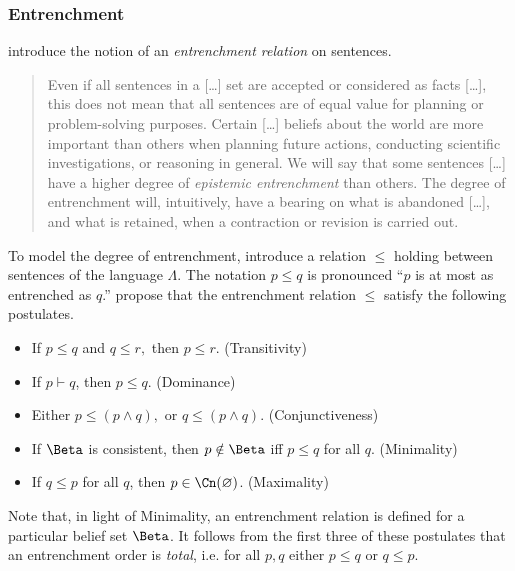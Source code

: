 \subsubsection{Entrenchment}
\label{entrenchment}
\citet{gardenfors1988revisions} introduce the notion of an {\em entrenchment
relation} on sentences.
\begin{quote}
  Even if all sentences in a [\ldots] set are accepted or considered as facts
  [\ldots], this does not mean that all sentences are of equal value for planning
  or problem-solving purposes. Certain [\ldots] beliefs about the world are more
  important than others when planning future actions, conducting scientific
  investigations, or reasoning in general. We will say that some sentences
  [\ldots] have a higher degree of {\em epistemic entrenchment} than others. The
  degree of entrenchment will, intuitively, have a bearing on what is abandoned
  [\ldots], and what is retained, when a contraction or revision is carried out. 
\end{quote} 
To model the degree of entrenchment, \citet{gardenfors1988revisions} introduce a
relation $\leq$ holding between sentences of the language $\Lambda.$ The
notation $p\leq q$ is pronounced ``$p$ is at most as entrenched as $q$.''
\citet{gardenfors1988revisions} propose that the entrenchment relation $\leq$
satisfy the following postulates.
\begin{itemize}
\item[] If $p\leq q$ and $q\leq r,$ then $p\leq r$. \hfill (Transitivity)
\item[] If $p\vdash q$, then $p\leq q$. \hfill(Dominance)
\item[] Either $p\leq (p\wedge q),$ or $q\leq (p \wedge q)$.
\hfill(Conjunctiveness)
\item[] If $\Beta$ is consistent, then $p\notin \Beta$ iff $p\leq q$ for all
$q$. \hfill(Minimality) 
\item[] If $q\leq p$ for all $q$, then $p\in \Cn(\varnothing)$.
\hfill(Maximality)
\end{itemize}
Note that, in light of Minimality, an entrenchment relation is defined for a
particular belief set $\Beta$. It follows from the first three of these
postulates that an entrenchment order is {\em total}, i.e. for all $p,q$ either
$p\leq q$ or $q\leq p$.

